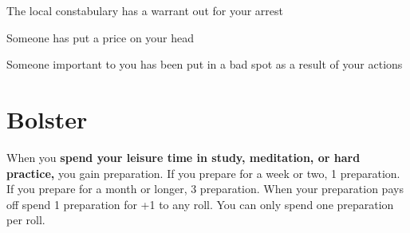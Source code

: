  
\startitemize[1,packed]

\item The local constabulary has a warrant out for your arrest

 
\item Someone has put a price on your head

 
\item Someone important to you has been put in a bad spot as a result of your actions


\stopitemize
 
\section{Bolster}   
 

When you {\bf spend your leisure time in study, meditation, or hard practice,}  you gain preparation. If you prepare for a week or two, 1 preparation. If you prepare for a month or longer, 3 preparation. When your preparation pays off spend 1 preparation for +1 to any roll. You can only spend one preparation per roll.







 
